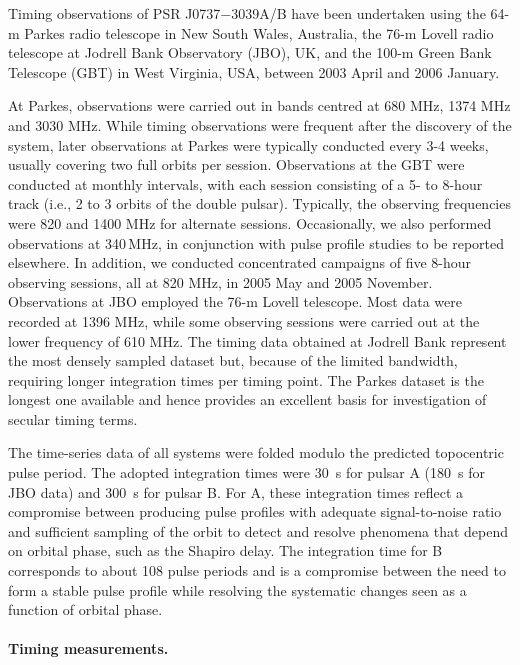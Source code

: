 \documentclass[12pt,psfig]{article}
\begin{document}
Timing observations of PSR J0737$-$3039A/B have been undertaken using the 64-m
Parkes radio telescope in New South Wales, Australia, 
the 76-m Lovell radio telescope at
Jodrell Bank Observatory (JBO), UK, and the 100-m Green Bank Telescope (GBT) 
in West Virginia, USA, between 2003 April and 2006 January. 

At Parkes, observations were carried out in bands centred 
at 680 MHz, 1374 MHz and 3030 MHz.
While timing observations were frequent after the discovery of the system,
later observations at Parkes were typically conducted every 3-4 weeks, usually
covering two full orbits per session. Observations at the GBT were conducted
at monthly intervals, with each session consisting of a 5- to 8-hour track
(i.e., 2 to 3 orbits of the double pulsar). Typically, the observing
frequencies were 820 and 1400 MHz for alternate sessions.  Occasionally, we
also performed observations at 340\,MHz, in conjunction with pulse profile
studies to be reported elsewhere.  In addition, we conducted concentrated
campaigns of five 8-hour observing sessions, all at 820 MHz, in 2005 May and
2005 November. Observations at JBO employed the 76-m Lovell telescope.  Most
data were recorded at 1396 MHz, while some observing sessions were carried out
at the lower frequency of 610 MHz. The timing data obtained at Jodrell Bank
represent the most densely sampled dataset but, because of the limited
bandwidth, requiring longer integration times per timing point.
The Parkes dataset is the
longest one available and hence provides an excellent basis for investigation
of secular timing terms.  

The time-series data of all systems were folded modulo the predicted
topocentric pulse period.  The adopted integration times were 30~s for pulsar
A (180~s for JBO data) and 300~s for pulsar B. For A, these integration times
reflect a compromise between producing pulse profiles with adequate
signal-to-noise ratio and sufficient sampling of the orbit to detect and
resolve phenomena that depend on orbital phase, such as the Shapiro delay. The
integration time for B corresponds to about 108 pulse periods and is a
compromise between the need to form a stable pulse profile while resolving the
systematic changes seen as a function of orbital phase.


\paragraph*{Timing measurements.}
\end{document}

